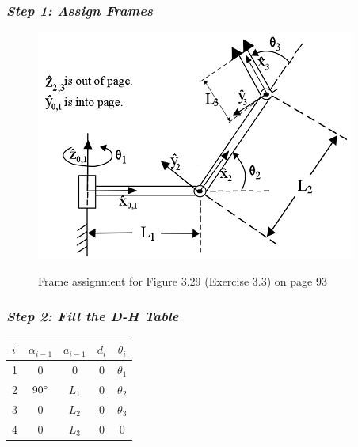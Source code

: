 \documentclass[10pt]{article}
\begin{document}
\subsubsection*{\textit{\textbf{Step 1: Assign Frames}}}
\begin{figure}[!h]
\centering
\includegraphics[]{Fig329b}
\it{\caption{Frame assignment for Figure 3.29 (Exercise 3.3) on page 93\cite{textbook}}}
\end{figure}
\subsubsection*{\textit{\textbf{Step 2: Fill the D-H Table}}}
\begin{center}
\begin{tabular}{ l | c c c c }
  $i$ & $\alpha_{i-1}$ & $a_{i-1}$ & $d_{i}$ & $\theta_{i}$ \\
  \hline
  1   & $0$            & $0$       & $0$     & $\theta_{1}$\\ 
  2   & $90\degree$    & $L_{1}$   & $0$     & $\theta_{2}$\\
  3   & $0$            & $L_{2}$   & $0$     & $\theta_{3}$\\
  4   & $0$            & $L_{3}$   & $0$     & $0$
\end{tabular}
\end{center}
\end{document}

